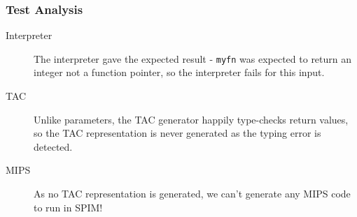 \subsubsection{Test Analysis}
\begin{description}
	\item[Interpreter] The interpreter gave the expected result - \verb!myfn! was expected to return an integer not a function pointer, so the interpreter fails for this input.
	\item[TAC] Unlike parameters, the TAC generator happily type-checks return values, so the TAC representation is never generated as the typing error is detected.
	\item[MIPS] As no TAC representation is generated, we can't generate any MIPS code to run in SPIM!
\end{description}
